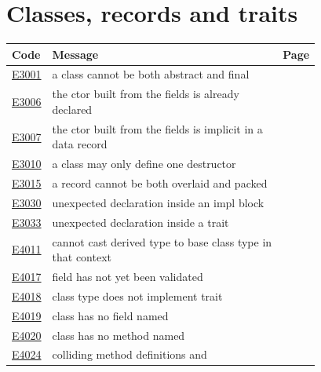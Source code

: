 
\clearpage
\section{Classes, records and traits}
\label{sec:codes:classes}

\begin{longtable}{@{}l p{0.78\linewidth} r@{}}
\toprule Code & Message & Page\\ \midrule \endhead
\hyperref[sec:codes:e3001]{E3001} & a class cannot be both abstract and final & \pageref{sec:codes:e3001}\\
\hyperref[sec:codes:e3006]{E3006} & the ctor built from the fields is already declared & \pageref{sec:codes:e3006}\\
\hyperref[sec:codes:e3007]{E3007} & the ctor built from the fields is implicit in a data record & \pageref{sec:codes:e3007}\\
\hyperref[sec:codes:e3010]{E3010} & a class may only define one destructor & \pageref{sec:codes:e3010}\\
\hyperref[sec:codes:e3015]{E3015} & a record cannot be both overlaid and packed & \pageref{sec:codes:e3015}\\
\hyperref[sec:codes:e3030]{E3030} & unexpected declaration inside an impl block & \pageref{sec:codes:e3030}\\
\hyperref[sec:codes:e3033]{E3033} & unexpected declaration inside a trait & \pageref{sec:codes:e3033}\\
\hyperref[sec:codes:e4011]{E4011} & cannot cast derived type \errhole{} to base class type \errhole{} in that context & \pageref{sec:codes:e4011}\\
\hyperref[sec:codes:e4017]{E4017} & field \errhole{} has not yet been validated & \pageref{sec:codes:e4017}\\
\hyperref[sec:codes:e4018]{E4018} & class type \errhole{} does not implement trait \errhole{} & \pageref{sec:codes:e4018}\\
\hyperref[sec:codes:e4019]{E4019} & class \errhole{} has no field named \errhole{} & \pageref{sec:codes:e4019}\\
\hyperref[sec:codes:e4020]{E4020} & class \errhole{} has no method named \errhole{} & \pageref{sec:codes:e4020}\\
\hyperref[sec:codes:e4024]{E4024} & colliding method definitions \errhole{} and \errhole{} & \pageref{sec:codes:e4024}\\

\end{longtable}
